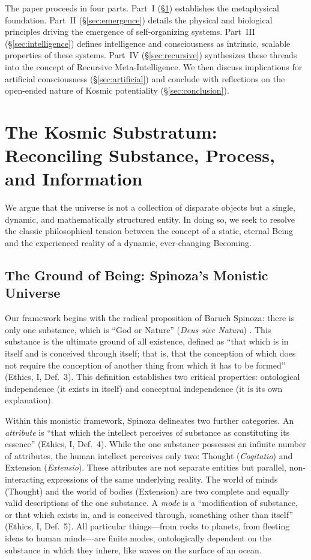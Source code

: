 \documentclass[12pt,a4paper]{article}
\begin{document}
The paper proceeds in four parts.  Part~I (\S\ref{sec:substratum})
establishes the metaphysical foundation.  Part~II
(\S\ref{sec:emergence}) details the physical and biological principles
driving the emergence of self-organizing systems.  Part~III
(\S\ref{sec:intelligence}) defines intelligence and consciousness as
intrinsic, scalable properties of these systems.  Part~IV
(\S\ref{sec:recursive}) synthesizes these threads into the concept of
Recursive Meta-Intelligence.  We then discuss implications for artificial
consciousness (\S\ref{sec:artificial}) and conclude with reflections on
the open-ended nature of Kosmic potentiality (\S\ref{sec:conclusion}).


\section{The Kosmic Substratum: Reconciling Substance, Process, and Information}
\label{sec:substratum}

We argue that the universe is not a collection of disparate objects but a
single, dynamic, and mathematically structured entity.  In doing so, we
seek to resolve the classic philosophical tension between the concept of a
static, eternal Being and the experienced reality of a dynamic,
ever-changing Becoming.

\subsection{The Ground of Being: Spinoza's Monistic Universe}
\label{sec:spinoza}

Our framework begins with the radical proposition of Baruch Spinoza: there
is only one substance, which is ``God or Nature'' (\emph{Deus sive
Natura}) \citep{spinoza1677}.  This substance is the ultimate ground of
all existence, defined as ``that which is in itself and is conceived
through itself; that is, that the conception of which does not require the
conception of another thing from which it has to be formed'' (Ethics, I,
Def.\ 3).  This definition establishes two critical properties:
ontological independence (it exists in itself) and conceptual independence
(it is its own explanation).

Within this monistic framework, Spinoza delineates two further categories.
An \emph{attribute} is ``that which the intellect perceives of substance as
constituting its essence'' (Ethics, I, Def.\ 4).  While the one substance
possesses an infinite number of attributes, the human intellect perceives
only two: Thought (\emph{Cogitatio}) and Extension (\emph{Extensio}).
These attributes are not separate entities but parallel, non-interacting
expressions of the same underlying reality.  The world of minds (Thought)
and the world of bodies (Extension) are two complete and equally valid
descriptions of the one substance.  A \emph{mode} is a ``modification of
substance, or that which exists in, and is conceived through, something
other than itself'' (Ethics, I, Def.\ 5).  All particular things---from
rocks to planets, from fleeting ideas to human minds---are finite modes,
ontologically dependent on the substance in which they inhere, like waves
on the surface of an ocean.
\end{document}
